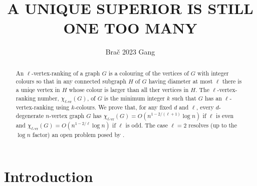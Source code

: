 \documentclass{patmorin}
\title{\MakeUppercase{A Unique Superior is Still One Too Many}}
\author{Bra\v{c} 2023 Gang}
\newcommand{\defin}[1]{\emph{\color{brightmaroon}#1}}
\newcommand{\rn}[1]{\chi_{\operatorname{#1-vr}}}
\newcommand{\trn}{\chi_{\mathrm{us}}}
\newcommand{\lrn}{\rn{\ell}}
\begin{document}
\maketitle

\begin{abstract}
  An $\ell$-vertex-ranking of a graph $G$ is a colouring of the vertices of $G$ with integer colours so that in any connected subgraph $H$ of $G$ having diameter at most $\ell$ there is a uniqe vertex in $H$ whose colour is larger than all ther vertices in $H$.  The $\ell$-vertex-ranking number, $\lrn(G)$, of $G$ is the minimum integer $k$ such that $G$ has an $\ell$-vertex-ranking using $k$-colours.  We prove that, for any fixed $d$ and $\ell$, every $d$-degenerate $n$-vertex graph $G$ has $\lrn(G)=O(n^{1-2/(\ell+1)}\log n)$ if $\ell$ is even and $\lrn(G)=O(n^{1-2/\ell}\log n)$ if $\ell$ is odd. The case $\ell=2$ resolves (up to the $\log n$ factor) an open problem posed by \citet{karpas.neiman.ea:on}.
\end{abstract}


%



\section{Introduction}
\end{document}
